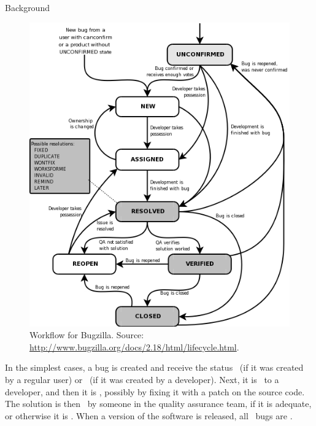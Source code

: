 \begin{section}{Background}
\begin{figure}[ht]
	\centering
		\includegraphics[scale=0.4]{bugzilla.png}
	\caption{Workflow for Bugzilla. Source: \url{http://www.bugzilla.org/docs/2.18/html/lifecycle.html}.}
	\label{fig:bugzilla}
\end{figure}

In the simplest cases, a bug is created and receive the status \UNCONFIRMED\ (if it was created by a regular user) or \NEW\ (if it was created by a developer). Next, it is \ASSIGNED\ to a developer, and then it is \RESOLVED, possibly by fixing it with a patch on the source code. The solution is then \VERIFIED\ by someone in the quality assurance team, if it is adequate, or otherwise it is \REOPENED. When a version of the software is released, all \VERIFIED\ bugs are \CLOSED.




\end{section}
